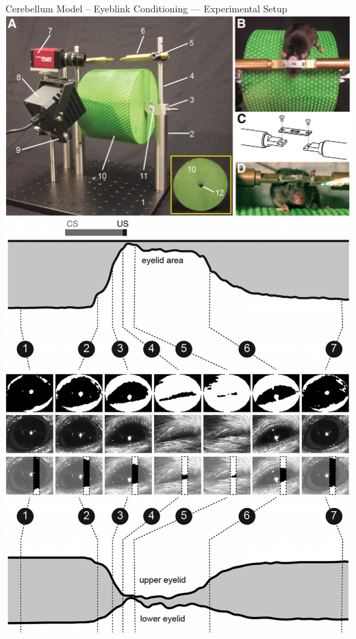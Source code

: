 \documentclass[handout,aspectratio=169]{beamer}
\begin{document}
	\begin{frame}{Cerebellum Model -- Eyeblink Conditioning --- Experimental Setup}
		\centering\hspace*{-1cm}\includegraphics[height=0.725\textheight]{media/heiney_at_al_apparatus.png}\includegraphics[height=0.725\textheight]{media/heiney_at_al_eyelid.png}
	\end{frame}
	
\end{document}
